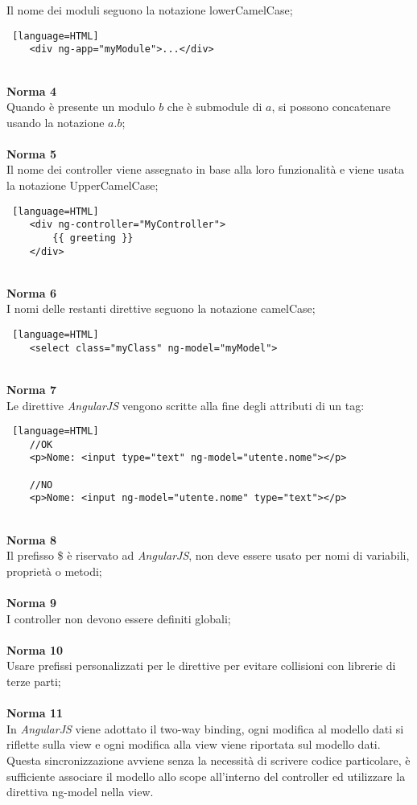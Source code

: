 Il nome dei moduli seguono la notazione lowerCamelCase;
\begin{lstlisting} [language=HTML]
	<div ng-app="myModule">...</div>
\end{lstlisting}
\-\\
\textbf{Norma 4}\\
Quando è presente un modulo $b$ che è submodule di $a$, si possono concatenare usando la notazione $a.b$;\\
\-\\
\textbf{Norma 5}\\
Il nome dei controller viene assegnato in base alla loro funzionalità e viene usata la notazione UpperCamelCase;
\begin{lstlisting} [language=HTML]
	<div ng-controller="MyController">
  		{{ greeting }}
	</div>
\end{lstlisting}
\-\\
\textbf{Norma 6}\\
I nomi delle restanti direttive seguono la notazione camelCase;
\begin{lstlisting} [language=HTML]
	<select class="myClass" ng-model="myModel">
\end{lstlisting}
\-\\
\textbf{Norma 7}\\
Le direttive \textit{AngularJS} vengono scritte alla fine degli attributi di un tag: 
\begin{lstlisting} [language=HTML]
	//OK
	<p>Nome: <input type="text" ng-model="utente.nome"></p>
	
	//NO
	<p>Nome: <input ng-model="utente.nome" type="text"></p>
\end{lstlisting}
\-\\
\textbf{Norma 8}\\
Il prefisso \$ è riservato ad \textit{AngularJS}, non deve essere usato per nomi di variabili, proprietà o metodi;\\
\-\\
\textbf{Norma 9}\\
I controller non devono essere definiti globali;\\
\-\\
\textbf{Norma 10}\\
Usare prefissi personalizzati per le direttive per evitare collisioni con librerie di terze parti;\\
\-\\
\textbf{Norma 11}\\
In \textit{AngularJS} viene adottato il two-way binding, ogni modifica al modello dati si riflette sulla view e ogni modifica alla view viene riportata sul modello dati.
\-\\
Questa sincronizzazione avviene senza la necessità di scrivere codice particolare, è sufficiente associare il modello allo scope all'interno del controller ed utilizzare la direttiva ng-model nella view.